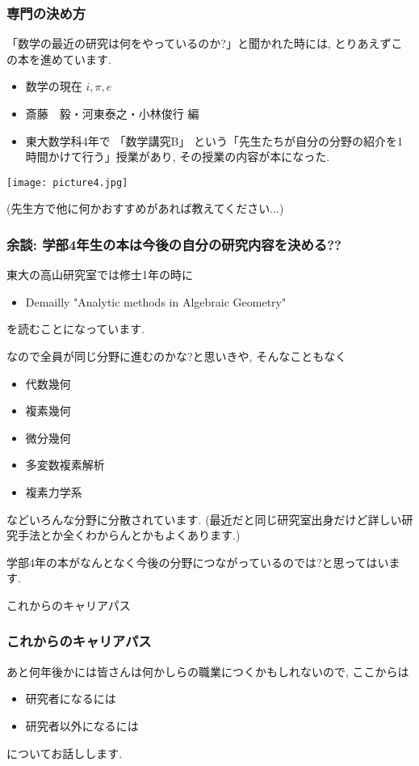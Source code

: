 \documentclass[11pt,dvipdfmx]{beamer}
\theoremstyle{definition}
\theoremstyle{remark}
\begin{document}
\begin{frame} 
 \frametitle{専門の決め方}
「数学の最近の研究は何をやっているのか?」と聞かれた時には, とりあえずこの本を進めています.
   \begin{multicols}{2}
     
        \begin{itemize}
	    \item 数学の現在 $i,\pi,e$
	     \item 斎藤　毅・河東泰之・小林俊行 編
	\item 東大数学科4年で 「数学講究B」 という「先生たちが自分の分野の紹介を1時間かけて行う」授業があり, その授業の内容が本になった.  
	\end{itemize}
     \texttt{[image: picture4.jpg]}
   \end{multicols}

(先生方で他に何かおすすめがあれば教えてください...)
\end{frame}




\begin{frame} 
 \frametitle{余談: 学部4年生の本は今後の自分の研究内容を決める??}
東大の高山研究室では修士1年の時に
        \begin{itemize}
 \item Demailly "Analytic methods in Algebraic Geometry"
	\end{itemize}
を読むことになっています.

なので全員が同じ分野に進むのかな?と思いきや, そんなこともなく
        \begin{itemize}
 \item 代数幾何
 \item 複素幾何
 \item 微分幾何
 \item 多変数複素解析
 \item 複素力学系
	\end{itemize}
などいろんな分野に分散されています. 
(最近だと同じ研究室出身だけど詳しい研究手法とか全くわからんとかもよくあります.)

学部4年の本がなんとなく今後の分野につながっているのでは?と思ってはいます.
\end{frame}

\begin{frame}  
 \begin{center}
これからのキャリアパス
 \end{center}
\end{frame}

 \begin{frame} 
 \frametitle{これからのキャリアパス}
あと何年後かには皆さんは何かしらの職業につくかもしれないので, ここからは
 \begin{itemize}
 \item 研究者になるには
 \item 研究者以外になるには
 \end{itemize}
 についてお話しします. 
 \end{frame}
 
\end{document}
